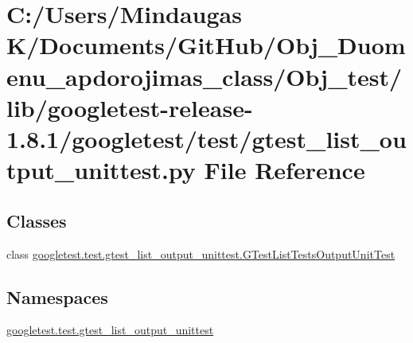 \hypertarget{_obj__test_2lib_2googletest-release-1_88_81_2googletest_2test_2gtest__list__output__unittest_8py}{}\section{C\+:/\+Users/\+Mindaugas K/\+Documents/\+Git\+Hub/\+Obj\+\_\+\+Duomenu\+\_\+apdorojimas\+\_\+class/\+Obj\+\_\+test/lib/googletest-\/release-\/1.8.1/googletest/test/gtest\+\_\+list\+\_\+output\+\_\+unittest.py File Reference}
\label{_obj__test_2lib_2googletest-release-1_88_81_2googletest_2test_2gtest__list__output__unittest_8py}
\subsection*{Classes}
\begin{DoxyCompactItemize}
\item 
class \mbox{\hyperlink{classgoogletest_1_1test_1_1gtest__list__output__unittest_1_1_g_test_list_tests_output_unit_test}{googletest.\+test.\+gtest\+\_\+list\+\_\+output\+\_\+unittest.\+G\+Test\+List\+Tests\+Output\+Unit\+Test}}
\end{DoxyCompactItemize}
\subsection*{Namespaces}
\begin{DoxyCompactItemize}
\item 
 \mbox{\hyperlink{namespacegoogletest_1_1test_1_1gtest__list__output__unittest}{googletest.\+test.\+gtest\+\_\+list\+\_\+output\+\_\+unittest}}
\end{DoxyCompactItemize}

